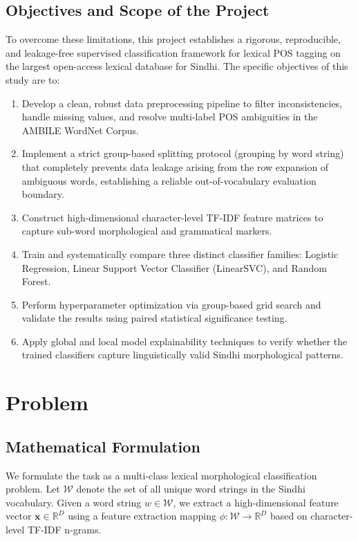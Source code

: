 \documentclass[12pt,a4paper]{article}
\begin{document}
\subsection{Objectives and Scope of the Project}
To overcome these limitations, this project establishes a rigorous, reproducible, and leakage-free supervised classification framework for lexical POS tagging on the largest open-access lexical database for Sindhi. The specific objectives of this study are to:
\begin{enumerate}
  \item Develop a clean, robust data preprocessing pipeline to filter inconsistencies, handle missing values, and resolve multi-label POS ambiguities in the AMBILE WordNet Corpus.
  \item Implement a strict group-based splitting protocol (grouping by word string) that completely prevents data leakage arising from the row expansion of ambiguous words, establishing a reliable out-of-vocabulary evaluation boundary.
  \item Construct high-dimensional character-level TF-IDF feature matrices to capture sub-word morphological and grammatical markers.
  \item Train and systematically compare three distinct classifier families: Logistic Regression, Linear Support Vector Classifier (LinearSVC), and Random Forest.
  \item Perform hyperparameter optimization via group-based grid search and validate the results using paired statistical significance testing.
  \item Apply global and local model explainability techniques to verify whether the trained classifiers capture linguistically valid Sindhi morphological patterns.
\end{enumerate}

\section{Problem}

\subsection{Mathematical Formulation}
We formulate the task as a multi-class lexical morphological classification problem. Let $\mathcal{W}$ denote the set of all unique word strings in the Sindhi vocabulary. Given a word string $w \in \mathcal{W}$, we extract a high-dimensional feature vector $\mathbf{x} \in \mathbb{R}^D$ using a feature extraction mapping $\phi: \mathcal{W} \rightarrow \mathbb{R}^D$ based on character-level TF-IDF n-grams.
\end{document}
